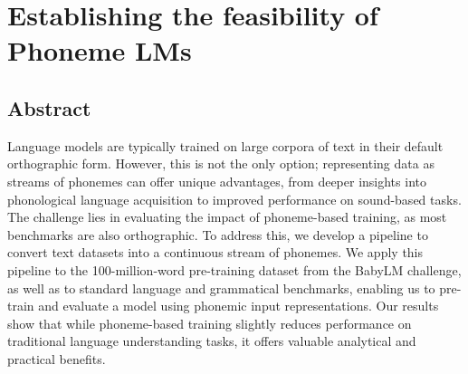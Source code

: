 \chapter{Establishing the feasibility of Phoneme LMs}\label{chapter:modelling}

\section{Abstract}

Language models are typically trained on large corpora of text in their default orthographic form. However, this is not the only option; representing data as streams of phonemes can offer unique advantages, from deeper insights into phonological language acquisition to improved performance on sound-based tasks. The challenge lies in evaluating the impact of phoneme-based training, as most benchmarks are also orthographic. To address this, we develop a pipeline to convert text datasets into a continuous stream of phonemes. We apply this pipeline to the 100-million-word pre-training dataset from the BabyLM challenge, as well as to standard language and grammatical benchmarks, enabling us to pre-train and evaluate a model using phonemic input representations. Our results show that while phoneme-based training slightly reduces performance on traditional language understanding tasks, it offers valuable analytical and practical benefits. 



